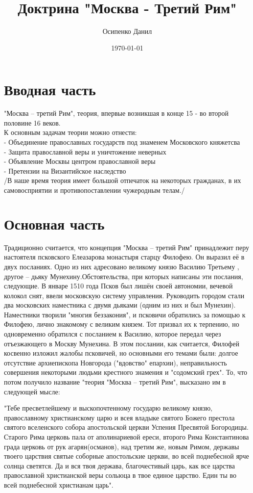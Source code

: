 \documentclass[a4paper, 12pt]{article}
\title{Доктрина "Москва - Третий Рим"}
\author{Осипенко Данил}
\date{\today}
\begin{document}
\sffamily
\maketitle
\section{Вводная часть}
"Москва -- третий Рим", теория, впервые возникшая в конце 15 - во второй половине 16 веков.\\

К основным задачам теории можно отнести:\\
- Объединение православных государств под знаменем Московского княжетсва\\
- Защита православной веры и уничтожение неверных\\
- Объявление Москвы центром православной веры\\
- Претензии на Византийское наследство\\

/В наше время теория имеет большой отпечаток на некоторых гражданах, в их самовосприятии и противопоставлении чужеродным телам./

\section{Основная часть}
Традиционно считается, что концепция "Москва -- третий Рим" принадлежит перу настоятеля псковского Елеазарова монастыря старцу Филофею. Он выразил её в двух посланиях. Одно из них адресовано великому князю Василию Третьему , другое -- дьяку Мунехину.Обстоятельства, при которых написаны эти послания, следующие. В январе 1510 года Псков был лишён своей автономии, вечевой колокол снят, ввели московскую систему управления. Руководить городом стали два московских наместника с двумя дьяками (одним из них и был Мунехин). Наместники творили "многия беззакония", и псковичи обратились за помощью к Филофею, лично знакомому с великим князем. Тот призвал их к терпению, но одновременно обратился с посланием к Василию, которое передал через отъезжающего в Москву Мунехина. В этом послании, как считается, Филофей косвенно изложил жалобы псковичей, но основными его темами были:  долгое отсутствие архиепископа Новгорода ("вдовство" епархии), неправильность совершения некоторыми людьми крестного знамения и "содомский грех". То, что потом получило название "теория "Москва -- третий Рим", высказано им в следующей мысле:

"Тебе пресветлейшему и выскопочтенному государю великому князю, православному христианскому царю и всея владыке святого Божего престола святого вселенского собора апостольской церкви Успения Пресвятой Богородицы. Старого Рима церковь пала от аполинариевой ереси, второго Рима Константинова града церковь от рук агарян(османов), над третим же, новым Римом, державы твоего царствия святые соборные апостольские церкви, во всей поднебесной ярче солнца светятся. Да и вся твоя держава, благочестивый царь, как все царства православной христианской веры сольюца в твое единое царство. Един ты во всей поднебесной христианам царь".
\end{document}
